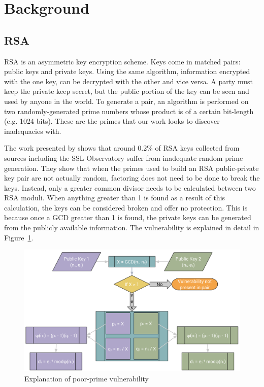 \documentclass[smallextended]{svjour3}       %
\begin{document}

\section{Background}
\label{sec:background}

\subsection{RSA}
\label{subsec:rsa}
RSA is an asymmetric key encryption scheme. Keys come in matched pairs:
public keys and private keys. Using the same algorithm, information encrypted
with the one key, can be decrypted with the other and vice versa. A party must
keep the private keep secret, but the public portion of the key can be seen and
used by anyone in the world. To generate a pair, an algorithm is performed on
two randomly-generated prime numbers whose product is of a certain bit-length
(e.g. 1024 bits). These are the primes that our work looks to discover
inadequacies with.

The work presented by \cite{lenstra2012ron} shows that around
0.2\% of RSA keys collected from sources including the SSL Observatory suffer
from inadequate random prime generation. They show that when the primes used to
build an RSA public-private key pair are not actually random, factoring does
not need to be done to break the keys. Instead, only a greater common divisor
needs to be calculated between two RSA moduli. When anything greater than 1 is
found as a result of this calculation, the keys can be considered broken and
offer no protection. This is because once a GCD greater than 1 is found, the
private keys can be generated from the publicly available information. The
vulnerability is explained in detail in Figure~\ref{fig:vuln}.

\begin{figure}
   \centering
   \includegraphics[width=\textwidth]{vulnerability}
   \caption{Explanation of poor-prime vulnerability}
   \label{fig:vuln}
\end{figure}
\end{document}
